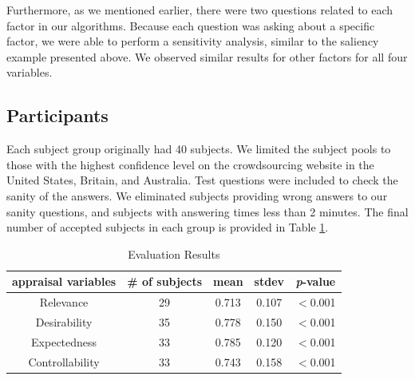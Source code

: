 \documentclass[12pt]{report}
\begin{document}
Furthermore, as we mentioned earlier, there were two questions related to each
factor in our algorithms. Because each question was asking about a specific
factor, we were able to perform a sensitivity analysis, similar to the saliency
example presented above. We observed similar results for other factors for all
four variables.

\subsection{Participants}
Each subject group originally had 40 subjects. We limited the subject pools to
those with the highest confidence level on the crowdsourcing website in the
United States, Britain, and Australia. Test questions were included to check the
sanity of the answers. We eliminated subjects providing wrong answers to our
sanity questions, and subjects with answering times less than 2 minutes. The
final number of accepted subjects in each group is provided in Table
\ref{tbl:statistics}.

\begin{table}[htbp]
\vspace*{-3mm}
\centering
\caption{Evaluation Results}
\begin{tabular}{|c|c|c|c|c|} \hline
appraisal variables & \# of subjects & mean & stdev & \textit{p}-value\\ \hline 
Relevance &  29 & 0.713 & 0.107 & $<$0.001\\ \hline
Desirability & 35 & 0.778 & 0.150 & $<$0.001\\ \hline 
Expectedness & 33 & 0.785 & 0.120 & $<$0.001\\ \hline 
Controllability & 33 & 0.743 & 0.158 & $<$0.001\\ \hline
\end{tabular}
\label{tbl:statistics}
\vspace*{-3mm}
\end{table}
\end{document}

